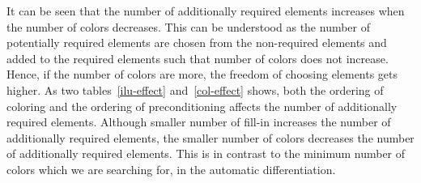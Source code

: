\documentclass[12pt, oneside]{book}
\begin{document}
It can be seen that the number of additionally required elements increases when 
the number of colors decreases. This can be understood as the number of potentially
required elements are chosen from the non-required elements and added to the required elements
such that number of colors does not increase. Hence, if the number of colors are more,
the freedom of choosing elements gets higher.
As two tables~\ref{ilu-effect} and~\ref{col-effect} shows, 
both the ordering of coloring and the ordering of preconditioning affects the number of
additionally required elements. Although smaller number of fill-in increases
the number of additionally required elements, the smaller number of colors 
decreases the number of additionally required elements.
This is in contrast to the minimum number of colors which we are searching for, 
in the automatic differentiation.

\end{document}
